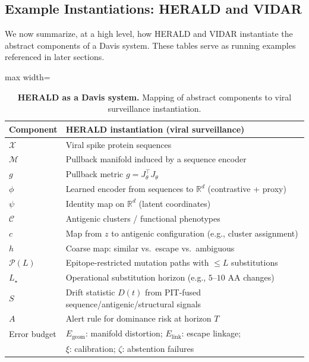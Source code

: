 \documentclass[11pt]{article}
\begin{document}
\subsection{Example Instantiations: HERALD and VIDAR}
\label{subsec:instantiations}

We now summarize, at a high level, how HERALD and VIDAR instantiate the abstract
components of a Davis system. These tables serve as running examples referenced in later sections.

\begin{table}[t]
    \centering
    \begin{adjustbox}{max width=\linewidth}
    \begin{tabular}{ll}
        \toprule
        Component & HERALD instantiation (viral surveillance) \\
        \midrule
        $\mathcal{X}$ & Viral spike protein sequences \\
        $\mathcal{M}$ & Pullback manifold induced by a sequence encoder \\
        $g$ & Pullback metric $g = J_\theta^\top J_\theta$ \\
        $\phi$ & Learned encoder from sequences to $\mathbb{R}^d$ (contrastive + proxy) \\
        $\psi$ & Identity map on $\mathbb{R}^d$ (latent coordinates) \\
        $\mathcal{C}$ & Antigenic clusters / functional phenotypes \\
        $c$ & Map from $z$ to antigenic configuration (e.g., cluster assignment) \\
        $h$ & Coarse map: similar vs.\ escape vs.\ ambiguous \\
        $\mathcal{P}(L)$ & Epitope-restricted mutation paths with $\le L$ substitutions \\
        $L_\star$ & Operational substitution horizon (e.g., $5$--$10$ AA changes) \\
        $S$ & Drift statistic $D(t)$ from PIT-fused sequence/antigenic/structural signals \\
        $A$ & Alert rule for dominance risk at horizon $T$ \\
        Error budget & $E_{\text{geom}}$: manifold distortion; $E_{\text{link}}$: escape linkage; \\
                     & $\xi$: calibration; $\zeta$: abstention failures \\
        \bottomrule
    \end{tabular}
    \end{adjustbox}
    \caption{\textbf{HERALD as a Davis system.} Mapping of abstract components to viral
    surveillance instantiation.}
    \label{tab:herald-davis}
\end{table}
\end{document}
